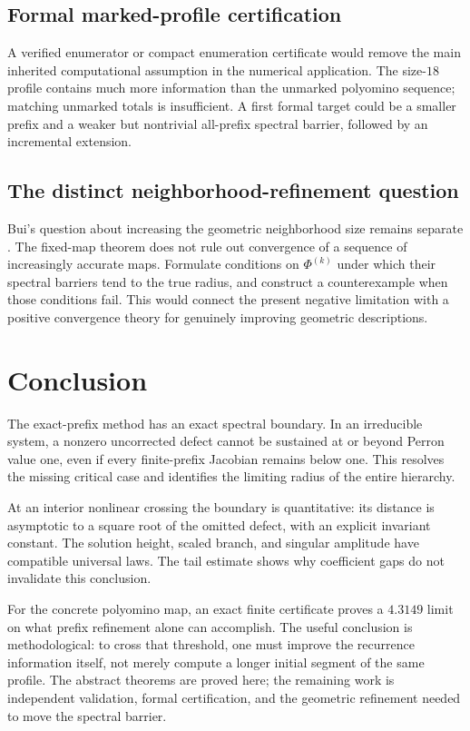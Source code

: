 \documentclass[11pt,a4paper]{article}
\theoremstyle{definition}
\theoremstyle{remark}
\begin{document}
\subsection{Formal marked-profile certification}
A verified enumerator or compact enumeration certificate would remove the
main inherited computational assumption in the numerical application.
The size-$18$ profile contains much more information than the unmarked
polyomino sequence; matching unmarked totals is insufficient. A first
formal target could be a smaller prefix and a weaker but nontrivial
all-prefix spectral barrier, followed by an incremental extension.

\subsection{The distinct neighborhood-refinement question}
Bui's question about increasing the geometric neighborhood size remains
separate \cite{bui}. The fixed-map theorem does not rule out convergence
of a sequence of increasingly accurate maps. Formulate conditions on
$\Phi^{(k)}$ under which their spectral barriers tend to the true radius,
and construct a counterexample when those conditions fail. This would
connect the present negative limitation with a positive convergence theory
for genuinely improving geometric descriptions.

\section{Conclusion}
The exact-prefix method has an exact spectral boundary. In an irreducible
system, a nonzero uncorrected defect cannot be sustained at or beyond
Perron value one, even if every finite-prefix Jacobian remains below one.
This resolves the missing critical case and identifies the limiting radius
of the entire hierarchy.

At an interior nonlinear crossing the boundary is quantitative:
its distance is asymptotic to a square root of the omitted defect, with
an explicit invariant constant. The solution height, scaled branch, and
singular amplitude have compatible universal laws. The tail estimate
shows why coefficient gaps do not invalidate this conclusion.

For the concrete polyomino map, an exact finite certificate proves a
$4.3149$ limit on what prefix refinement alone can accomplish. The useful
conclusion is methodological: to cross that threshold, one must improve
the recurrence information itself, not merely compute a longer initial
segment of the same profile. The abstract theorems are proved here; the
remaining work is independent validation, formal certification, and the
geometric refinement needed to move the spectral barrier.
\end{document}
